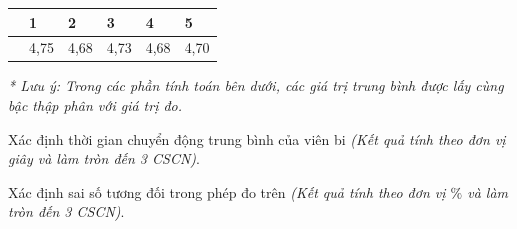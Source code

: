 \begin{center}
	\begin{longtable}{|M{4cm}|M{2cm}|M{2cm}|M{2cm}|M{2cm}|M{2cm}|}
		\hline
		&1&2&3&4&5\\
		\hline
		& 4,75 & 4,68 & 4,73 & 4,68 & 4,70\\
		\hline
	\end{longtable}
\end{center}
\textit{* Lưu ý: Trong các phần tính toán bên dưới, các giá trị trung bình được lấy cùng bậc thập phân với giá trị đo.}
\begin{ex}
Xác định thời gian chuyển động trung bình của viên bi \textit{(Kết quả tính theo đơn vị giây và làm tròn đến 3 CSCN)}.
\end{ex}
\begin{ex}
Xác định sai số tương đối trong phép đo trên \textit{(Kết quả tính theo đơn vị $\si{\percent}$ và làm tròn đến 3 CSCN)}.
\end{ex}
